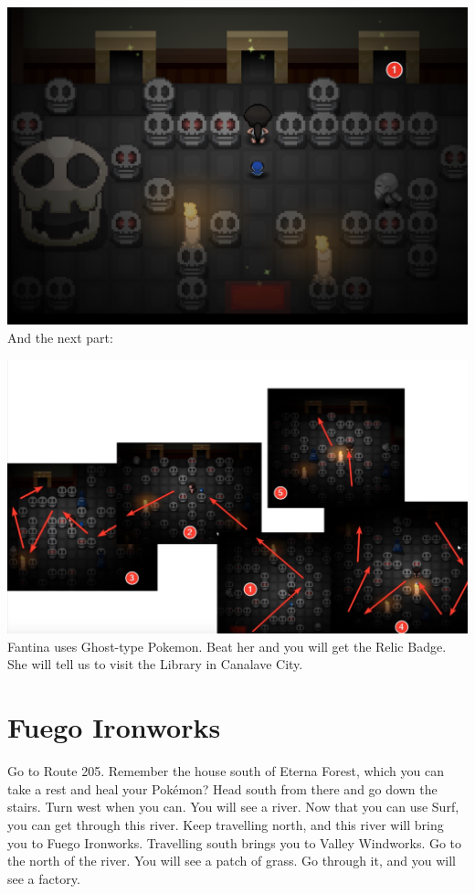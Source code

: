 \documentclass[11pt]{article}
\begin{document}
\includegraphics[width=\textwidth]{walkthrough/Sinnoh/hearthome_gym_1}
And the next part:

\includegraphics[width=\textwidth]{walkthrough/Sinnoh/hearthome_gym_2}
Fantina uses Ghost-type Pokemon.
Beat her and you will get the Relic Badge.
She will tell us to visit the Library in Canalave City.

\section{Fuego Ironworks}\label{sec:fuego-ironworks}
Go to Route 205.
Remember the house south of Eterna Forest,
which you can take a rest and heal your Pokémon?
Head south from there and go down the stairs.
Turn west when you can.
You will see a river.
Now that you can use Surf, you can get through this river.
Keep travelling north, and this river will bring you to Fuego Ironworks.
Travelling south brings you to Valley Windworks.
Go to the north of the river.
You will see a patch of grass.
Go through it, and you will see a factory.
\end{document}
